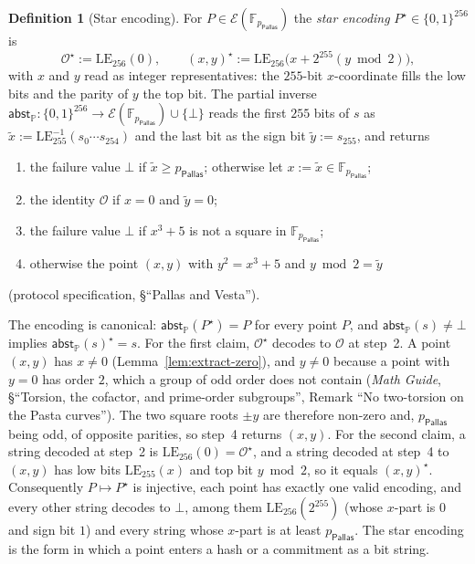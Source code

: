 \documentclass[11pt,a4paper]{article}
\theoremstyle{definition}
\newtheorem{definition}[theorem]{Definition}
\newcommand{\F}{\mathbb{F}}
\newcommand{\PP}{\mathbb{P}}
\newcommand{\Pallas}{\ensuremath{\mathsf{Pallas}}}
\newcommand{\Ep}{\ensuremath{\mathcal{E}}}
\begin{document}
\begin{definition}[Star encoding]
For $P \in \Ep(\F_{p_{\Pallas}})$ the \emph{star encoding}
$P^{\star} \in \{0,1\}^{256}$ is
\[
  \mathcal{O}^{\star} := \mathrm{LE}_{256}(0), \qquad
  (x, y)^{\star} := \mathrm{LE}_{256}\bigl(x + 2^{255} (y \bmod 2)\bigr),
\]
with $x$ and $y$ read as integer representatives: the $255$-bit
$x$-coordinate fills the low bits and the parity of $y$ the top bit. The
partial inverse $\mathsf{abst}_{\PP} \colon \{0,1\}^{256} \to
\Ep(\F_{p_{\Pallas}}) \cup \{\bot\}$ reads the first $255$ bits of $s$ as
$\tilde{x} := \mathrm{LE}_{255}^{-1}(s_0 \cdots s_{254})$ and the last bit as
the sign bit $\tilde{y} := s_{255}$, and returns
\begin{enumerate}
\item the failure value $\bot$ if $\tilde{x} \ge p_{\Pallas}$; otherwise
  let $x := \tilde{x} \in \F_{p_{\Pallas}}$;
\item the identity $\mathcal{O}$ if $x = 0$ and $\tilde{y} = 0$;
\item the failure value $\bot$ if $x^3 + 5$ is not a square in
  $\F_{p_{\Pallas}}$;
\item otherwise the point $(x, y)$ with $y^2 = x^3 + 5$ and
  $y \bmod 2 = \tilde{y}$
\end{enumerate}
(protocol specification, \S``Pallas and Vesta'').
\end{definition}

The encoding is canonical: $\mathsf{abst}_{\PP}(P^{\star}) = P$ for every
point $P$, and $\mathsf{abst}_{\PP}(s) \neq \bot$ implies
$\mathsf{abst}_{\PP}(s)^{\star} = s$. For the first claim,
$\mathcal{O}^{\star}$ decodes to $\mathcal{O}$ at step~2. A point $(x, y)$
has $x \neq 0$ (Lemma~\ref{lem:extract-zero}), and $y \neq 0$ because a
point with $y = 0$ has order $2$, which a group of odd order does not
contain (\emph{Math Guide}, \S``Torsion, the cofactor, and prime-order
subgroups'', Remark ``No two-torsion on the Pasta curves''). The two square
roots $\pm y$ are therefore non-zero and, $p_{\Pallas}$ being odd, of
opposite parities, so step~4 returns $(x, y)$. For the second claim, a
string decoded at step~2 is $\mathrm{LE}_{256}(0) = \mathcal{O}^{\star}$, and
a string decoded at step~4 to $(x, y)$ has low bits $\mathrm{LE}_{255}(x)$
and top bit $y \bmod 2$, so it equals $(x, y)^{\star}$. Consequently
$P \mapsto P^{\star}$ is injective, each point has exactly one valid
encoding, and every other string decodes to $\bot$, among them
$\mathrm{LE}_{256}(2^{255})$ (whose $x$-part is $0$ and sign bit $1$) and
every string whose $x$-part is at least $p_{\Pallas}$. The star encoding is
the form in which a point enters a hash or a commitment as a bit string.
\end{document}
